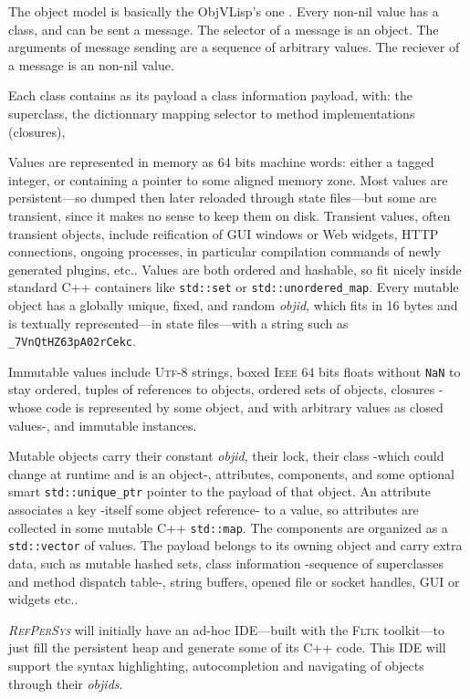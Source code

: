 \documentclass{IEEEtran}
\newcommand{\RefPerSys}{{\textit{\textsc{RefPerSys}}}}
\begin{document}
The object model is basically the ObjVLisp's one
\cite{cointe:1987:metaclasses}. Every non-nil value has a class, and
can be sent a message. The selector of a message is an object. The
arguments of message sending are a sequence of arbitrary values. The
reciever of a message is an non-nil value.

Each class contains as its payload a class information payload, with: the superclass, the dictionnary mapping selector to method implementations (closures), 
\medskip


Values are represented in memory as
64 bits machine words: either a tagged integer, or containing a
pointer to some aligned memory zone. Most values are persistent---so
dumped then later reloaded through state files---but some are transient,
since it makes no sense to keep them on disk. Transient values, often
transient objects, include reification of GUI windows or Web widgets,
HTTP connections, ongoing processes, in particular compilation
commands of newly generated plugins, etc.. Values are both ordered
and hashable, so fit nicely inside standard C++ containers like
\texttt{std::set} or \texttt{std::unordered\_map}. Every mutable
object has a globally unique, fixed, and random \emph{objid}, which
fits in 16 bytes and is textually represented---in state files---with a
string such as \texttt{\_7VnQtHZ63pA02rCekc}.

Immutable values include \textsc{Utf-8} strings, boxed \textsc{Ieee}
64 bits floats without \texttt{NaN} to stay ordered, tuples of
references to objects, ordered sets of objects, closures -whose code
is represented by some object, and with arbitrary values as closed
values-, and immutable instances.

Mutable objects carry their constant \emph{objid}, their lock, their
class -which could change at runtime and is an object-, attributes,
components, and some optional smart \texttt{std::unique\_ptr} pointer
to the payload of that object. An attribute associates a key -itself
some object reference- to a value, so attributes are collected in some
mutable C++ \texttt{std::map}. The components are organized as a
\texttt{std::vector} of values. The payload belongs to its owning
object and carry extra data, such as mutable hashed sets, class
information -sequence of superclasses and method dispatch table-,
string buffers, opened file or socket handles, GUI or widgets etc..

{\RefPerSys} will initially have an ad-hoc IDE---built with the \textsc{Fltk}
toolkit---to just fill the persistent heap and generate some of its C++
code. This IDE will support the syntax highlighting, autocompletion and
navigating of objects through their \emph{objids}.
\end{document}
